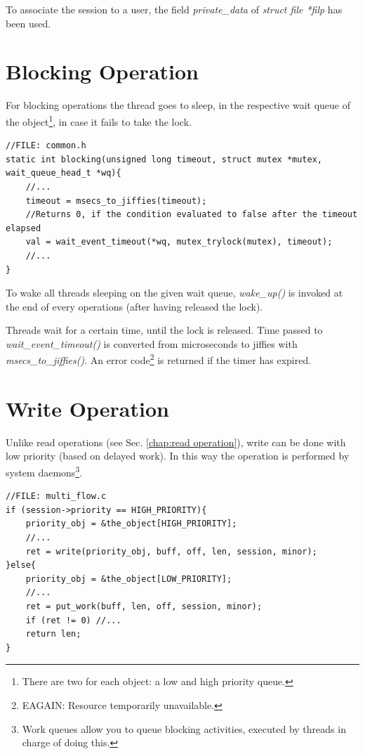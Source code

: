 \documentclass[12pt]{report}
\begin{document}
To associate the session to a user, the field \emph{private\_data} of \emph{struct file *filp} has been used. 

\section{Blocking Operation}
\label{chap:blocking operation}
For blocking operations the thread goes to sleep, in the respective wait queue of the object\footnote{There are  two for each object: a low and high priority queue.}, in case it fails to take the lock. 

\begin{lstlisting}
//FILE: common.h
static int blocking(unsigned long timeout, struct mutex *mutex, wait_queue_head_t *wq){
	//...	
	timeout = msecs_to_jiffies(timeout); 	
	//Returns 0, if the condition evaluated to false after the timeout elapsed
	val = wait_event_timeout(*wq, mutex_trylock(mutex), timeout);
	//...
}
\end{lstlisting}

To wake all threads sleeping on the given wait queue, \emph{wake\_up()} is invoked at the end of every operations (after having released the lock). 

Threads wait for a certain time, until the lock is released. Time passed to \emph{wait\_event\_timeout()} is converted from microseconds to jiffies with \emph{msecs\_to\_jiffies()}. An error code\footnote{EAGAIN: Resource temporarily unavailable.} is returned if the timer has expired.

\section{Write Operation}
\label{chap:write operation}

Unlike read operations (see Sec. \ref{chap:read operation}), write can be done with low priority (based on delayed work). In this way the operation is performed by system daemons\footnote{Work queues allow you to queue blocking activities, executed by threads in charge of doing this.}.

\begin{lstlisting}
//FILE: multi_flow.c
if (session->priority == HIGH_PRIORITY){
	priority_obj = &the_object[HIGH_PRIORITY];
	//...	
	ret = write(priority_obj, buff, off, len, session, minor);
}else{
	priority_obj = &the_object[LOW_PRIORITY];
	//...	
	ret = put_work(buff, len, off, session, minor);
	if (ret != 0) //...
	return len;
}
\end{lstlisting}
\end{document}
